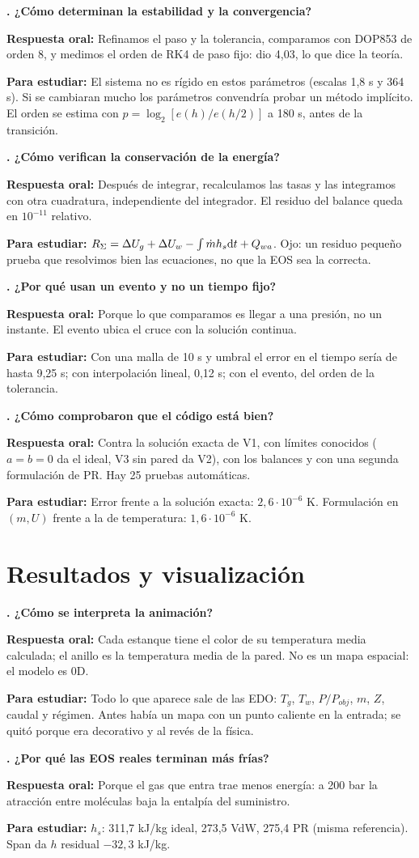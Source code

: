 \documentclass[11pt]{article}
\newcounter{preg}
\newcommand{\pregunta}[3]{\stepcounter{preg}%
\begin{tcolorbox}[colback=white,colframe=tinta!25,boxrule=0.5pt,sharp corners,left=6pt,right=6pt,top=4pt,bottom=4pt,breakable]
\textbf{\color{tinta}\thepreg. #1}\par\smallskip
\textbf{Respuesta oral:} #2\par\smallskip
{\color{gris}\small\textbf{Para estudiar:} #3}
\end{tcolorbox}}
\begin{document}
\pregunta{¿Cómo determinan la estabilidad y la convergencia?}
{Refinamos el paso y la tolerancia, comparamos con DOP853 de orden 8, y medimos el orden de RK4 de paso fijo: dio 4,03, lo que dice la teoría.}
{El sistema no es rígido en estos parámetros (escalas 1,8 s y 364 s). Si se cambiaran mucho los parámetros
convendría probar un método implícito. El orden se estima con $p=\log_2[e(h)/e(h/2)]$ a 180 s, antes de la transición.}

\pregunta{¿Cómo verifican la conservación de la energía?}
{Después de integrar, recalculamos las tasas y las integramos con otra cuadratura, independiente del integrador. El residuo del balance queda en $10^{-11}$ relativo.}
{$R_\Sigma=\Delta U_g+\Delta U_w-\int\dot m h_s\mathrm{d} t+Q_{wa}$. Ojo: un residuo pequeño prueba que resolvimos bien las ecuaciones, no que la EOS sea la correcta.}

\pregunta{¿Por qué usan un evento y no un tiempo fijo?}
{Porque lo que comparamos es llegar a una presión, no un instante. El evento ubica el cruce con la solución continua.}
{Con una malla de 10 s y umbral el error en el tiempo sería de hasta 9,25 s; con interpolación lineal, 0,12 s; con el evento, del orden de la tolerancia.}

\pregunta{¿Cómo comprobaron que el código está bien?}
{Contra la solución exacta de V1, con límites conocidos ($a=b=0$ da el ideal, V3 sin pared da V2), con los balances y con una segunda formulación de PR. Hay 25 pruebas automáticas.}
{Error frente a la solución exacta: $2{,}6\cdot10^{-6}$ K. Formulación en $(m,U)$ frente a la de temperatura: $1{,}6\cdot10^{-6}$ K.}

\section{Resultados y visualización}
\pregunta{¿Cómo se interpreta la animación?}
{Cada estanque tiene el color de su temperatura media calculada; el anillo es la temperatura media de la pared. No es un mapa espacial: el modelo es 0D.}
{Todo lo que aparece sale de las EDO: $T_g$, $T_w$, $P/P_{obj}$, $m$, $Z$, caudal y régimen. Antes había un mapa
con un punto caliente en la entrada; se quitó porque era decorativo y al revés de la física.}

\pregunta{¿Por qué las EOS reales terminan más frías?}
{Porque el gas que entra trae menos energía: a 200 bar la atracción entre moléculas baja la entalpía del suministro.}
{$h_s$: 311,7 kJ/kg ideal, 273,5 VdW, 275,4 PR (misma referencia). Span da $h$ residual $-32{,}3$ kJ/kg.}
\end{document}
